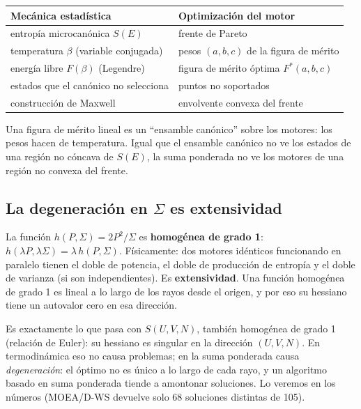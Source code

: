 \begin{center}
\begin{tabular}{ll}
\toprule
\textbf{Mecánica estadística} & \textbf{Optimización del motor}\\
\midrule
entropía microcanónica $S(E)$ & frente de Pareto\\
temperatura $\beta$ (variable conjugada) & pesos $(a,b,c)$ de la figura de mérito\\
energía libre $F(\beta)$ (Legendre) & figura de mérito óptima $F^*(a,b,c)$\\
estados que el canónico no selecciona & puntos no soportados\\
construcción de Maxwell & envolvente convexa del frente\\
\bottomrule
\end{tabular}
\end{center}

\begin{idea}
Una figura de mérito lineal es un ``ensamble canónico'' sobre los motores: los pesos hacen de
temperatura. Igual que el ensamble canónico no ve los estados de una región no cóncava de
$S(E)$, la suma ponderada no ve los motores de una región no convexa del frente.
\end{idea}

\subsection{La degeneración en $\Sigma$ es extensividad}

La función $h(P,\Sigma) = 2P^2/\Sigma$ es \textbf{homogénea de grado 1}: $h(\lambda P,\lambda\Sigma) =
\lambda\,h(P,\Sigma)$. Físicamente: dos motores idénticos funcionando en paralelo tienen el doble de
potencia, el doble de producción de entropía y el doble de varianza (si son independientes). Es
\textbf{extensividad}. Una función homogénea de grado 1 es lineal a lo largo de los rayos desde el
origen, y por eso su hessiano tiene un autovalor cero en esa dirección.

Es exactamente lo que pasa con $S(U,V,N)$, también homogénea de grado 1 (relación de Euler): su
hessiano es singular en la dirección $(U,V,N)$. En termodinámica eso no causa problemas; en la suma
ponderada causa \emph{degeneración}: el óptimo no es único a lo largo de cada rayo, y un algoritmo
basado en suma ponderada tiende a amontonar soluciones. Lo veremos en los números (MOEA/D-WS
devuelve solo 68 soluciones distintas de 105).

